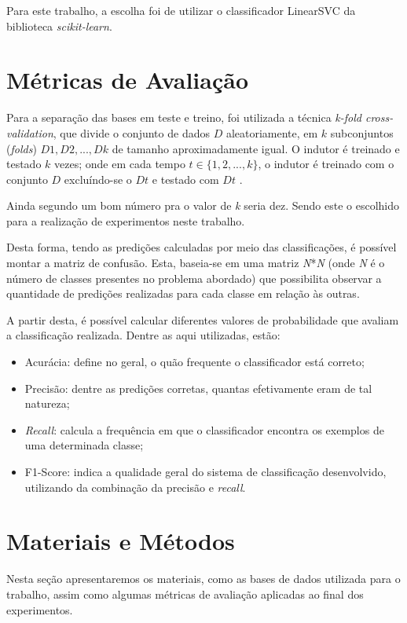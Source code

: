\documentclass[12pt]{article}
\begin{document}
    Para este trabalho, a escolha foi de utilizar o classificador LinearSVC da biblioteca \textit{scikit-learn}. 

\section{Métricas de Avaliação} \label{expandaval}
    Para a separação das bases em teste e treino, foi utilizada a técnica \textit{k-fold cross-validation}, que divide o conjunto de dados $D$ aleatoriamente, em $k$ subconjuntos (\textit{folds}) $D1, D2,..., Dk$ de tamanho aproximadamente igual. O indutor é treinado e testado $k$ vezes; onde em cada tempo $t \in \{1,2,...,k\}$, o indutor é treinado com o conjunto $D$ excluíndo-se o $Dt$ e testado com $Dt$ \cite{kohavi}.
    
    Ainda segundo \cite{kohavi} um bom número pra o valor de \textit{k} seria dez. Sendo este o escolhido para a realização de experimentos neste trabalho.
    
    Desta forma, tendo as predições calculadas por meio das classificações, é possível montar a matriz de confusão. Esta, baseia-se em uma matriz \textit{N}*\textit{N} (onde \textit{N} é o número de classes presentes no problema abordado) que possibilita observar a quantidade de predições realizadas para cada classe em relação às outras. 
    
    A partir desta, é possível calcular diferentes valores de probabilidade que avaliam a classificação realizada. Dentre as aqui utilizadas, estão:
        
    \begin{itemize}
        \item Acurácia: define no geral, o quão frequente o classificador está correto;
        \item Precisão: dentre as predições corretas, quantas efetivamente eram de tal natureza;
        \item \textit{Recall}: calcula a frequência em que o classificador encontra os exemplos de uma determinada classe;
        \item F1-Score: indica a qualidade geral do sistema de classificação desenvolvido, utilizando da combinação da precisão e \textit{recall}.
    \end{itemize}

\section{Materiais e Métodos}\label{mat}
Nesta seção apresentaremos os materiais, como as bases de dados utilizada para o trabalho, assim como algumas métricas de avaliação aplicadas ao final dos experimentos.
\end{document}
